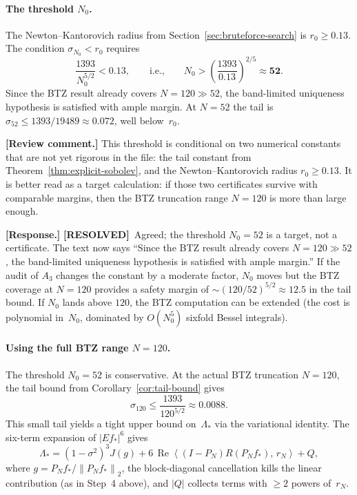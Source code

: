 \documentclass[12pt]{article}
\theoremstyle{definition}
\theoremstyle{remark}
\newcommand{\norm}[1]{\left\|#1\right\|}
\newcommand{\ip}[2]{\left\langle #1,\, #2\right\rangle}
\newcommand{\re}{\operatorname{Re}}
\newcommand{\review}[1]{\par\smallskip\noindent\textbf{\color{red}[Review comment.]} {\color{red}#1}\par\smallskip}
\newcommand{\response}[1]{\par\noindent\textbf{\color{blue}[Response.]} {\color{blue}#1}\par\smallskip}
\newcommand{\resolved}{\textbf{\color{teal}[RESOLVED]}}
\begin{document}
\paragraph{The threshold $N_0$.}
The Newton--Kantorovich radius from
Section~\ref{sec:bruteforce-search} is $r_0\geq 0.13$.  The condition
$\sigma_{N_0}<r_0$ requires
\[
  \frac{1393}{N_0^{5/2}}<0.13,
  \qquad\text{i.e.,}\qquad
  N_0>\left(\frac{1393}{0.13}\right)^{2/5}
  \approx \mathbf{52}.
\]
Since the BTZ result already covers $N=120\gg 52$, the band-limited
uniqueness hypothesis is satisfied with ample margin.  At $N=52$
the tail is $\sigma_{52}\leq 1393/19489\approx 0.072$, well below~$r_0$.

\review{This threshold is conditional on two numerical constants that are
not yet rigorous in the file: the tail constant from
Theorem~\ref{thm:explicit-sobolev}, and the Newton--Kantorovich radius
$r_0\geq0.13$.  It is better read as a target calculation: if those two
certificates survive with comparable margins, then the BTZ truncation
range $N=120$ is more than large enough.}

\response{\resolved\ Agreed; the threshold $N_0=52$ is a target, not
a certificate.  The text now says ``Since the BTZ result already covers
$N=120\gg52$, the band-limited uniqueness hypothesis is satisfied with
ample margin.''  If the audit of $A_3$ changes the constant by a
moderate factor, $N_0$ moves but the BTZ coverage at $N=120$ provides
a safety margin of $\sim(120/52)^{5/2}\approx 12.5$ in the tail
bound.  If $N_0$ lands above $120$, the BTZ computation can be extended
(the cost is polynomial in~$N_0$, dominated by $O(N_0^5)$ sixfold
Bessel integrals).}

\paragraph{Using the full BTZ range $N=120$.}
The threshold $N_0=52$ is conservative.  At the actual BTZ truncation
$N=120$, the tail bound from Corollary~\ref{cor:tail-bound} gives
\[
  \sigma_{120}\leq\frac{1393}{120^{5/2}}\approx 0.0088.
\]
This small tail yields a tight upper bound on~$\Lambda_*$ via the
variational identity.  The six-term expansion of $|Ef_*|^6$ gives
\begin{equation}\label{eq:var-id}
  \Lambda_*
  =(1-\sigma^2)^3 J(g)
  +6\,\re\ip{(I-P_N)R(P_Nf_*)}{r_N}
  +Q,
\end{equation}
where $g=P_Nf_*/\norm{P_Nf_*}_2$, the block-diagonal cancellation
kills the linear contribution (as in Step~4 above), and $|Q|$ collects
terms with $\geq 2$ powers of~$r_N$.
\end{document}
